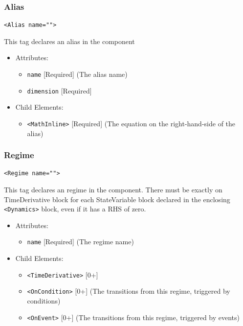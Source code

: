 \documentclass{article}
\begin{document}
\subsubsection{Alias}
%
\begin{lstlisting}
<Alias name="">
\end{lstlisting}

This tag declares an alias in the component

\begin{itemize}
\item Attributes:
\begin{itemize}
\item \verb|name| {[}Required{]} (The alias name)
\item \verb|dimension| {[}Required{]}
\end{itemize}

\item Child Elements:
\begin{itemize}
\item \verb|<MathInline>| {[}Required{]} (The equation on the right-hand-side of the alias)
\end{itemize}
\end{itemize}





\subsubsection{Regime}
%
\begin{lstlisting}
<Regime name="">
\end{lstlisting}

This tag declares an regime in the component. There must be exactly on
TimeDerivative block for each StateVariable block declared in the enclosing
\verb|<Dynamics>| block, even if it has a RHS of zero.

\begin{itemize}
\item Attributes:
\begin{itemize}
\item \verb|name| {[}Required{]} (The regime name)
\end{itemize}

\item Child Elements:
\begin{itemize}
\item \verb|<TimeDerivative>| {[}0+{]}
\item \verb|<OnCondition>| {[}0+{]} (The transitions from this regime, triggered by conditions)
\item \verb|<OnEvent>| {[}0+{]} (The transitions from this regime, triggered by events)
\end{itemize}

\end{itemize}
\end{document}
